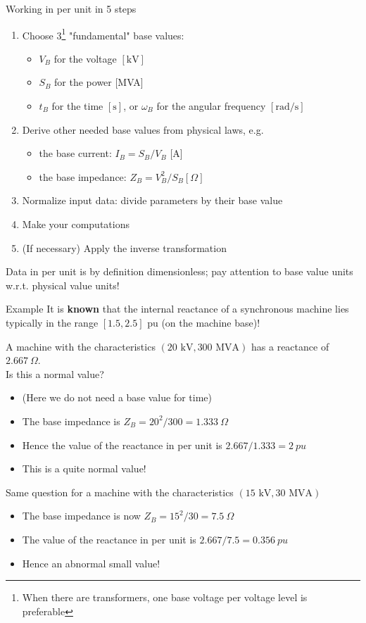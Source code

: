 \begin{frame}{Working in per unit in 5 steps}
\begin{enumerate}
    \item Choose 3\footnote{When there are transformers, one base voltage per voltage level is preferable} "fundamental" base values:
    \begin{itemize}
        \item $V_B$ for the voltage $[\mathrm{kV}]$
        \item $S_B$ for the power [MVA]
        \item $t_B$ for the time $[\mathrm{s}]$, or $\omega_B$ for the angular frequency $[\mathrm{rad} / \mathrm{s}]$
    \end{itemize}
    \item Derive other needed base values from physical laws, e.g.
    \begin{itemize}
        \item the base current: $I_B=S_B / V_B$ [A]
        \item the base impedance: $Z_B=V_B^2 / S_B[\Omega]$
    \end{itemize}
    \item Normalize input data: divide parameters by their base value
    \item Make your computations
    \item (If necessary) Apply the inverse transformation
\end{enumerate}

Data in per unit is by definition dimensionless; pay attention to base value units w.r.t. physical value units!
\end{frame}

\begin{frame}[allowframebreaks]{Example}
    It is \textbf{known} that the internal reactance of a synchronous machine lies typically in the range $[1.5, 2.5] \text{ pu}$ (on the machine base)! 
     
    A machine with the characteristics $(20 \text{ kV}, 300 \text{ MVA})$ has a reactance of $2.667 \ \Omega$.\\ Is this a normal value?
    \begin{itemize}
        \item (Here we do not need a base value for time)
        \item The base impedance is $Z_B = 20^2/300 = 1.333 \ \Omega$
        \item Hence the value of the reactance in per unit is $2.667/1.333 = 2 \ pu$
        \item This is a quite normal value!
    \end{itemize}
    Same question for a machine with the characteristics $(15 \text{ kV}, 30 \text{ MVA})$
    \begin{itemize}
        \item The base impedance is now $Z_B=15^2/30 = 7.5 \ \Omega$
        \item The value of the reactance in per unit is $2.667/7.5 = 0.356 \ pu$
        \item Hence an abnormal small value!
    \end{itemize}
\end{frame}

